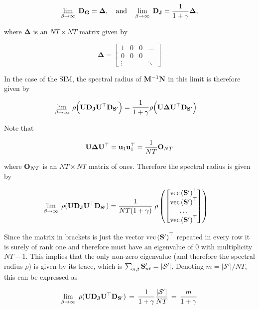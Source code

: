 $$
\lim_{\beta \rightarrow \infty} \; \mathbf{D}_{\mathbf{G}} = \mathbf{\Delta}, \quad \text{and} \quad \lim_{\beta \rightarrow \infty} \; \mathbf{D}_{\mathbf{J}} = \frac{1}{1 + \gamma} \mathbf{\Delta}, 
$$

where $\mathbf{\Delta}$ is an $NT \times NT$ matrix given by

$$
\mathbf{\Delta} = \begin{bmatrix}
    1 & 0 & 0 & \dots \\
    0 & 0 & 0 &  \\
    \vdots & & & \ddots
\end{bmatrix}
$$

 In the case of the SIM, the spectral radius of $\mathbf{M}^{-1}\mathbf{N}$ in this limit is therefore given by

\begin{align*}
    \lim_{\beta \rightarrow \infty} \; \rho\Big(\mathbf{U} \mathbf{D}_{\mathbf{J}} \mathbf{U}^\top \mathbf{D}_{\mathbf{S}'} \Big) &= \frac{1}{1 + \gamma} \rho\Big(\mathbf{U} \mathbf{\Delta} \mathbf{U}^\top \mathbf{D}_{\mathbf{S}'} \Big)
\end{align*}

Note that 

\begin{equation*}
    \mathbf{U} \mathbf{\Delta} \mathbf{U}^\top = \mathbf{u}_1 \mathbf{u}_1^\top  = \frac{1}{NT} \mathbf{O}_{NT}
\end{equation*}

where $ \mathbf{O}_{NT}$ is an $NT \times NT$ matrix of ones. Therefore the spectral radius is given by 

\begin{align*}
    \lim_{\beta \rightarrow \infty} \; \rho(\mathbf{U} \mathbf{D}_{\mathbf{J}} \mathbf{U}^\top \mathbf{D}_{\mathbf{S}'}) &= \frac{1}{NT (1 + \gamma) } \; \rho \left( \begin{bmatrix}
        \text{\textup{vec}}\left(\mathbf{S}'\right)^\top \\ \text{\textup{vec}}\left(\mathbf{S}'\right)^\top \\ \dots \\ \text{\textup{vec}}\left(\mathbf{S}'\right)^\top
    \end{bmatrix} \right)
\end{align*}

Since the matrix in brackets is just the vector $\text{\textup{vec}}\left(\mathbf{S}'\right)^\top$ repeated in every row it is surely of rank one and therefore must have an eigenvalue of 0 with multiplicity $NT - 1$. This implies that the only non-zero eigenvalue (and therefore the spectral radius $\rho$) is given by its trace, which is $\sum_{n, t}\mathbf{S}'_{nt} = |\mathcal{S}'|$. Denoting  $m=|\mathcal{S}'|/NT$, this can be expressed as 

\begin{equation}
    \label{eq:beta_lim_inf}
    \lim_{\beta \rightarrow \infty} \; \rho(\mathbf{U} \mathbf{D}_{\mathbf{J}} \mathbf{U}^\top \mathbf{D}_{\mathbf{S}'}) \, = \, \frac{1}{1 + \gamma} \frac{|\mathcal{S}'|}{NT} \, = \, \frac{m}{1 + \gamma}
\end{equation}

